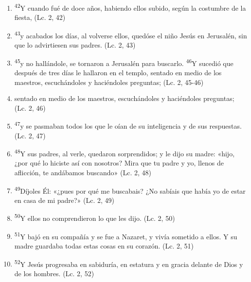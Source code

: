 \documentclass[a4paper,11pt]{article}
\begin{document}
      \begin{enumerate}
        \item \textsuperscript{42}Y cuando fué de doce años, habiendo ellos subido, según la costumbre de la fiesta, (Lc. 2, 42)
        
        \item \textsuperscript{43}y acabados los días, al volverse ellos, quedóse el niño Jesús en Jerusalén, sin que lo advirtiesen sus padres. (Lc. 2, 43)
        
        \item \textsuperscript{45}y no hallándole, se tornaron a Jerusalén para buscarlo. \textsuperscript{46}Y sucedió que después de tres días le hallaron en el templo,
        sentado en medio de los maestros, escuchándoles y haciéndoles preguntas; (Lc. 2, 45-46)
        
        \item sentado en medio de los maestros, escuchándoles y haciéndoles preguntas; (Lc. 2, 46)
        
        \item \textsuperscript{47}y se pasmaban todos los que le oían de su inteligencia y de sus respuestas. (Lc. 2, 47)

        \item \textsuperscript{48}Y sus padres, al verle, quedaron sorprendidos; y le dijo su madre: «hijo, ¿por qué lo hiciste así con nosotros? Mira que tu padre
        y yo, llenos de aflicción, te andábamos buscando» (Lc. 2, 48)
        
        \item \textsuperscript{49}Díjoles Él: «¿pues por qué me buscabais? ¿No sabíais que había yo de estar en casa de mi padre?» (Lc. 2, 49)
        
        \item \textsuperscript{50}Y ellos no comprendieron lo que les dijo. (Lc. 2, 50)
        
        \item \textsuperscript{51}Y bajó en su compañía y se fue a Nazaret, y vivía sometido a ellos. Y su madre guardaba todas estas
        cosas en su corazón. (Lc. 2, 51)
        
        \item \textsuperscript{52}Y Jesús progresaba en sabiduría, en estatura y en gracia delante de Dios y de los hombres. (Lc. 2, 52)
      \end{enumerate}
\end{document}
